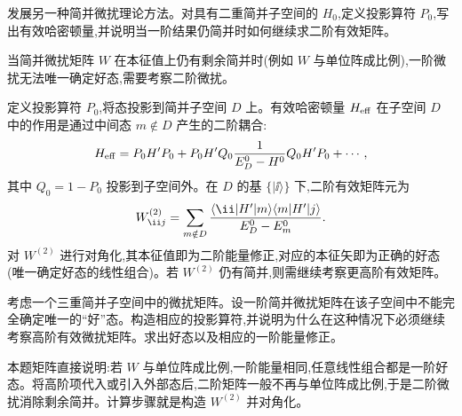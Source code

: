 \begin{question}
发展另一种简并微扰理论方法。对具有二重简并子空间的 $H_0$,定义投影算符 $P_0$,写出有效哈密顿量,并说明当一阶结果仍简并时如何继续求二阶有效矩阵。
\end{question}
\begin{solution}
当简并微扰矩阵 $W$ 在本征值上仍有剩余简并时(例如 $W$ 与单位阵成比例),一阶微扰无法唯一确定好态,需要考察二阶微扰。

定义投影算符 $P_0$,将态投影到简并子空间 $D$ 上。有效哈密顿量 $H_{\rm eff}$ 在子空间 $D$ 中的作用是通过中间态 $m\notin D$ 产生的二阶耦合:
\[
H_{\rm eff} = P_0 H' P_0 + P_0 H' Q_0 {1\over E_D^0-H^0} Q_0 H' P_0 + \cdots,
\]
其中 $Q_0=1-P_0$ 投影到子空间外。在 $D$ 的基 $\{|\ii\rangle\}$ 下,二阶有效矩阵元为
\[
W^{(2)}_{\ii j} = \sum_{m\notin D} {\langle \ii|H'|m\rangle\langle m|H'|j\rangle\over E_D^0 - E_m^0}.
\]
对 $W^{(2)}$ 进行对角化,其本征值即为二阶能量修正,对应的本征矢即为正确的好态(唯一确定好态的线性组合)。若 $W^{(2)}$ 仍有简并,则需继续考察更高阶有效矩阵。
\end{solution}

\begin{question}
考虑一个三重简并子空间中的微扰矩阵。设一阶简并微扰矩阵在该子空间中不能完全确定唯一的“好”态。构造相应的投影算符,并说明为什么在这种情况下必须继续考察高阶有效微扰矩阵。求出好态以及相应的一阶能量修正。
\end{question}
\begin{solution}
本题矩阵直接说明:若 $W$ 与单位阵成比例,一阶能量相同,任意线性组合都是一阶好态。将高阶项代入或引入外部态后,二阶矩阵一般不再与单位阵成比例,于是二阶微扰消除剩余简并。计算步骤就是构造 $W^{(2)}$ 并对角化。
\end{solution}

